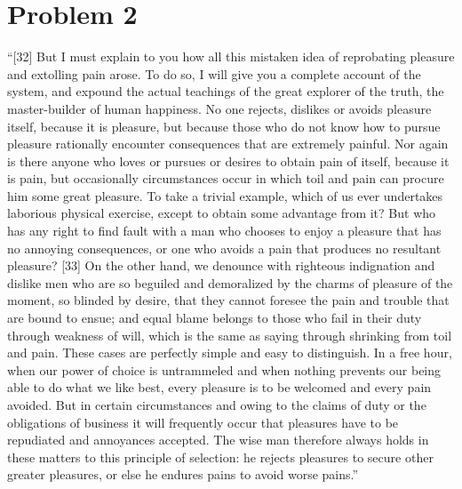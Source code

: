 \documentclass[letterpaper]{article}
\begin{document}
\section*{Problem 2}
\begin{ddanger}
``[32] But I must explain to you how all this mistaken idea of reprobating pleasure and extolling pain arose. To do so, I will give you a complete account of the system, and expound the actual teachings of the great explorer of the truth, the master-builder of human happiness. No one rejects, dislikes or avoids pleasure itself, because it is pleasure, but because those who do not know how to pursue pleasure rationally encounter consequences that are extremely painful. Nor again is there anyone who loves or pursues or desires to obtain pain of itself, because it is pain, but occasionally circumstances occur in which toil and pain can procure him some great pleasure. To take a trivial example, which of us ever undertakes laborious physical exercise, except to obtain some advantage from it? But who has any right to find fault with a man who chooses to enjoy a pleasure that has no annoying consequences, or one who avoids a pain that produces no resultant pleasure? [33] On the other hand, we denounce with righteous indignation and dislike men who are so beguiled and demoralized by the charms of pleasure of the moment, so blinded by desire, that they cannot foresee the pain and trouble that are bound to ensue; and equal blame belongs to those who fail in their duty through weakness of will, which is the same as saying through shrinking from toil and pain. These cases are perfectly simple and easy to distinguish. In a free hour, when our power of choice is untrammeled and when nothing prevents our being able to do what we like best, every pleasure is to be welcomed and every pain avoided. But in certain circumstances and owing to the claims of duty or the obligations of business it will frequently occur that pleasures have to be repudiated and annoyances accepted. The wise man therefore always holds in these matters to this principle of selection: he rejects pleasures to secure other greater pleasures, or else he endures pains to avoid worse pains.''~\cite{book:lorem_ipsum}
\hfill{}
\end{ddanger}

\printbibliography
\end{document}
